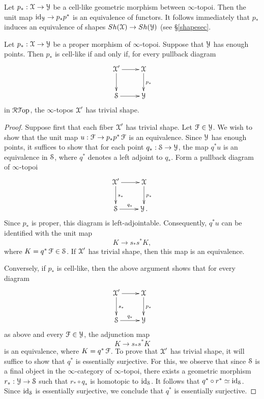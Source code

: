 \begin{remark}\label{urjk}
Let $p_{\ast}: \operatorname{\mathcal{X}} \rightarrow \operatorname{\mathcal{Y}}$ be a cell-like geometric morphism between $\infty$-topoi.
Then the unit map $\operatorname{id}_{\operatorname{\mathcal{Y}}} \rightarrow p_{\ast} p^{\ast}$ is an equivalence of functors. It follows immediately that $p_{\ast}$ induces an equivalence of shapes $Sh(\operatorname{\mathcal{X}}) \rightarrow Sh(\operatorname{\mathcal{Y}})$ (see \S \ref{shapesec}.
\end{remark}

\begin{proposition}\label{fibersilly}
Let $p_{\ast}: \operatorname{\mathcal{X}} \rightarrow \operatorname{\mathcal{Y}}$ be a proper morphism of $\infty$-topoi. Suppose that
$\operatorname{\mathcal{Y}}$ has enough points. Then $p_{\ast}$ is cell-like if and only if, for every pullback diagram
$$ \xymatrix{ \calX' \ar[r] \ar[d] & \calX \ar[d]^{p_{\ast}} \\
\SSet \ar[r] & \calY }$$
in $\operatorname{\mathcal{R}{\mathcal T}op}$, the $\infty$-topos $\operatorname{\mathcal{X}}'$ has trivial shape.
\end{proposition}

\begin{proof}
Suppose first that each fiber $\operatorname{\mathcal{X}}'$ has trivial shape. Let $\operatorname{\mathcal{F}} \in \operatorname{\mathcal{Y}}$. We wish to show that the unit map $u: \operatorname{\mathcal{F}} \rightarrow p_{\ast} p^{\ast} \operatorname{\mathcal{F}}$ is an equivalence. Since $\operatorname{\mathcal{Y}}$ has enough points, it suffices to show that for each point $q_{\ast}: \operatorname{\mathcal{S}} \rightarrow \operatorname{\mathcal{Y}}$, the map $q^{\ast} u$ is an equivalence in $\operatorname{\mathcal{S}}$, where $q^{\ast}$ denotes a left adjoint to $q_{\ast}$.
Form a pullback diagram of $\infty$-topoi
$$ \xymatrix{ \calX' \ar[r] \ar[d]^{s_{\ast}} & \calX \ar[d]^{p_{\ast}} \\
\SSet \ar[r]^{q_{\ast}} & \calY. }$$
Since $p_{\ast}$ is proper, this diagram is left-adjointable. Consequently,
$q^{\ast} u$ can be identified with the unit map
$$ K \rightarrow s_{\ast} s^{\ast} K,$$
where $K = q^{\ast} \operatorname{\mathcal{F}} \in \operatorname{\mathcal{S}}$. If $\operatorname{\mathcal{X}}'$ has trivial shape, then this map is an equivalence.

Conversely, if $p_{\ast}$ is cell-like, then the above argument shows that for every diagram
$$ \xymatrix{ \calX' \ar[r] \ar[d]^{s_{\ast}} & \calX \ar[d]^{p_{\ast}} \\
\SSet \ar[r]^{q_{\ast}} & \calY }$$
as above and every $\operatorname{\mathcal{F}} \in \operatorname{\mathcal{Y}}$, the adjunction map
$$ K \rightarrow s_{\ast} s^{\ast} K$$ is an equivalence, where
$K = q^{\ast} \operatorname{\mathcal{F}}$. To prove that $\operatorname{\mathcal{X}}'$ has trivial shape, it will suffice to show that $q^{\ast}$ is essentially surjective. For this, we observe that since $\operatorname{\mathcal{S}}$ is a final object in the $\infty$-category of $\infty$-topoi, there exists a geometric morphism
$r_{\ast}: \operatorname{\mathcal{Y}} \rightarrow \operatorname{\mathcal{S}}$ such that $r_{\ast} \circ q_{\ast}$ is homotopic to $\operatorname{id}_{\operatorname{\mathcal{S}}}$.
It follows that $q^{\ast} \circ r^{\ast} \simeq \operatorname{id}_{\operatorname{\mathcal{S}}}$. Since $\operatorname{id}_{\operatorname{\mathcal{S}}}$ is essentially surjective, we conclude that $q^{\ast}$ is essentially surjective.
\end{proof}

